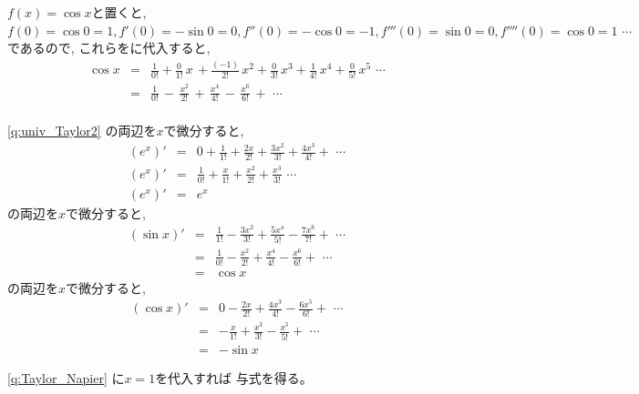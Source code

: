 $f(x)=\cos x$と置くと, $f(0)=\cos 0 = 1, f'(0)=-\sin 0 = 0, f''(0)=-\cos 0 = -1, f'''(0)=\sin 0=0, f''''(0) = \cos 0 = 1 \,\,\cdots$であるので, これらをに代入すると, 
\begin{eqnarray*}
\cos x &=& \frac{1}{0!} + \frac{0}{1!}\,x\, + \frac{(-1)}{2!}\,x^2 + \frac{0}{3!}\,x^3 + \frac{1}{4!}\,x^4 + \frac{0}{5!}\,x^5\,\, \cdots \\
&=& \frac{1}{0!}\,-\,\frac{x^2}{2!}\,+\,\frac{x^4}{4!}\,-\,\frac{x^6}{6!}\,+\,\, \cdots \\
\end{eqnarray*}
\mv

\ref{q:univ_Taylor2}
の両辺を$x$で微分すると, 
\begin{eqnarray*}
(e^x)' &=&  0 + \frac{1}{1!} + \frac{2x}{2!} + \frac{3x^2}{3!} + \frac{4x^3}{4!} + \,\, \cdots \\
(e^x)' &=& \frac{1}{0!} + \frac{x}{1!} + \frac{x^2}{2!} + \frac{x^3}{3!} \,\, \cdots \\
(e^x)' &=& e^x 
\end{eqnarray*}
の両辺を$x$で微分すると, 
\begin{eqnarray*}
(\sin x)' &=& \frac{1}{1!} - \frac{3x^2}{3!} + \frac{5x^4}{5!} - \frac{7x^6}{7!} + \,\, \cdots \\
          &=& \frac{1}{0!} - \frac{x^2}{2!} + \frac{x^4}{4!} - \frac{x^6}{6!} + \,\, \cdots \\
          &=& \cos x
\end{eqnarray*}
の両辺を$x$で微分すると, 
\begin{eqnarray*}
(\cos x)' &=& 0 - \frac{2x}{2!} + \frac{4x^3}{4!} - \frac{6x^5}{6!} + \,\, \cdots \\
           &=& -  \frac{x}{1!} + \frac{x^3}{3!} - \frac{x^5}{5!} + \,\, \cdots  \\
           &=& - \sin x
\end{eqnarray*}

\ref{q:Taylor_Napier} に$x=1$を代入すれば
与式を得る。\mv


